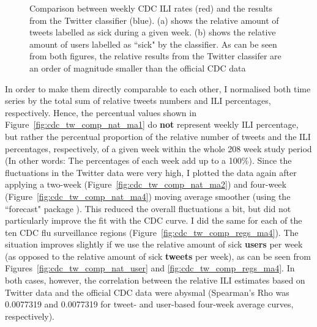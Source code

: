 \documentclass[11pt, a4paper,twoside]{report}\usepackage[]{graphicx}\usepackage[]{color}
\begin{document}
\begin{figure}[H]
\begin{subfigure}[t]{0.49\textwidth}
  \caption{}
  \end{subfigure}
  \caption{Comparison between weekly CDC ILI rates (red) and the results from the Twitter classifier (blue). (a) shows the relative amount of tweets labelled as sick during a given week. (b) shows the relative amount of users labelled as ``sick" by the classifier. As can be seen from both figures, the relative results from the Twitter classifer are an order of magnitude smaller than the official CDC data}
  \label{fig:naive_comparison_CDC_twitter}
\end{figure}

In order to make them directly comparable to each other, I normalised both time series by the total sum of relative tweets numbers and ILI percentages, respectively. Hence, the percentual values shown in Figure~\ref{fig:cdc_tw_comp_nat_ma1} do \textbf{not} represent weekly ILI percentage, but rather the percentual proportion of the relative number of tweets and the ILI percentages, respectively, of a given week within the whole 208 week study period (In other words: The percentages of each week add up to a 100\%). Since the fluctuations in the Twitter data were very high, I plotted the data again after applying a two-week (Figure~\ref{fig:cdc_tw_comp_nat_ma2}) and four-week (Figure~\ref{fig:cdc_tw_comp_nat_ma4}) moving average smoother (using the ``forecast" package ). This reduced the overall fluctuations a bit, but did not particularly improve the fit with the CDC curve. I did the same for each of the ten CDC flu surveillance regions (Figure~\ref{fig:cdc_tw_comp_regs_ma4}). The situation improves slightly if we use the relative amount of sick \textbf{users} per week (as opposed to the relative amount of sick \textbf{tweets} per week), as can be seen  from Figures~\ref{fig:cdc_tw_comp_nat_user} and \ref{fig:cdc_tw_comp_regs_ma4}. In both cases, however, the correlation between the relative ILI estimates based on Twitter data and the official CDC data were abysmal (Spearman's Rho was 0.0077319 and 0.0077319 for tweet- and user-based four-week average curves, respectively).\newline 
\end{document}
